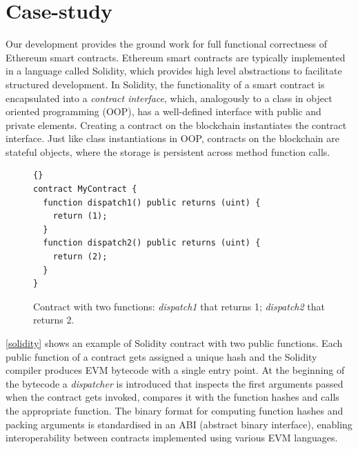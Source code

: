 \documentclass[sigplan,10pt,review]{acmart}\settopmatter{printfolios=true,printccs=false,printacmref=false}
\begin{document}
\section{Case-study}
\label{sec:case}



Our development provides the ground work for full functional correctness
of Ethereum smart contracts.
Ethereum smart contracts are typically implemented in a language called Solidity,
which provides high level abstractions to facilitate 
structured development.
In Solidity, the functionality of a smart contract is encapsulated into a
\textit{contract interface}, which, analogously to a class in object oriented programming
(OOP), has a well-defined interface with public and private elements.
Creating a contract on the blockchain instantiates the contract interface.
Just like class instantiations in OOP, contracts on the blockchain are
stateful objects, where the storage is persistent across method function calls.

\begin{figure}[h!]
\begin{lstlisting}[language=Solidity]{}
contract MyContract {
  function dispatch1() public returns (uint) {
  	return (1);
  }
  function dispatch2() public returns (uint) {
  	return (2);
  }
}
\end{lstlisting}
\caption{Contract with two functions: \textit{dispatch1} that returns 1; \textit{dispatch2} that returns 2.}
\label{solidity}
\end{figure}

\autoref{solidity} shows an example of Solidity contract with two public functions.
Each public function of a contract gets assigned a unique hash and
the Solidity compiler produces EVM bytecode with a single entry point.
At the beginning of the bytecode a \textit{dispatcher} is introduced that inspects the first arguments
passed when the contract gets invoked, compares it with the function hashes and
calls the appropriate function.
The binary format for computing function hashes and packing arguments is standardised
in an ABI (abstract binary interface), enabling interoperability between
contracts implemented using various EVM languages.
\end{document}
